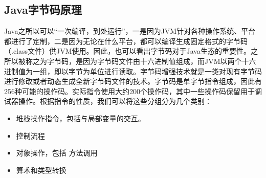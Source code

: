 \documentclass[../../../interview-questions.tex]{subfiles}
\begin{document}
\subsection{Java字节码原理}

Java之所以可以“一次编译，到处运行”，一是因为JVM针对各种操作系统、平台都进行了定制，二是因为无论在什么平台，都可以编译生成固定格式的字节码（.class文件）供JVM使用。因此，也可以看出字节码对于Java生态的重要性。之所以被称之为字节码，是因为字节码文件由十六进制值组成，而JVM以两个十六进制值为一组，即以字节为单位进行读取。字节码增强技术就是一类对现有字节码进行修改或者动态生成全新字节码文件的技术。字节码是单字节指令组成，因此有256种可能的操作码。实际指令使用大约200个操作码，其中一些操作码保留用于调试器操作。根据指令的性质，我们可以将这些分组分为几个类别：

\begin{itemize}
    \item {堆栈操作指令，包括与局部变量的交互。}
    \item {控制流程}
    \item {对象操作，包括 方法调用}
    \item {算术和类型转换}
\end{itemize}
\end{document}
